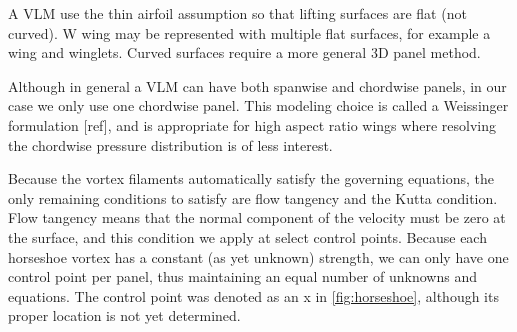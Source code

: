 \documentclass{article}
\begin{document}
A VLM use the thin airfoil assumption so that  lifting surfaces are flat (not curved).  W wing may be represented with multiple flat surfaces, for example a wing and winglets.  Curved surfaces require a more general 3D panel method.

Although in general a VLM can have both spanwise and chordwise panels, in our case we only use one chordwise panel.  This modeling choice is called a Weissinger formulation [ref], and is appropriate for high aspect ratio wings where resolving the chordwise pressure distribution is of less interest.  



Because the vortex filaments automatically satisfy the governing equations, the only remaining conditions to satisfy are flow tangency and the Kutta condition.  Flow tangency means that the normal component of the velocity must be zero at the surface, and this condition we apply at select control points.  Because each horseshoe vortex has a constant (as yet unknown) strength, we can only have one control point per panel, thus maintaining an equal number of unknowns and equations.  The control point was denoted as an x in \cref{fig:horseshoe}, although its proper location is not yet determined.



\end{document}
